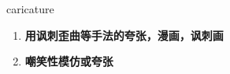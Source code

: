 
\begin{frame}
{\huge caricature}
\begin{center}
\begin{enumerate}\Large
  \item \textbf{用讽刺歪曲等手法的夸张，漫画，讽刺画}
  \item \textbf{嘲笑性模仿或夸张}
\end{enumerate}
\end{center}
\end{frame}
